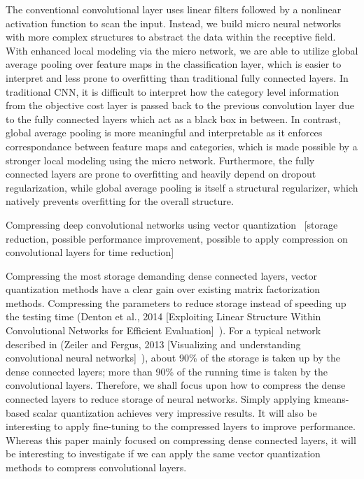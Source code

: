 \documentclass{article} %
\begin{document}
The conventional convolutional layer uses linear filters followed by a nonlinear activation function to scan the input. Instead, we build micro neural networks with more complex structures to abstract the data within the receptive field. With enhanced local modeling via the micro network, we are able to utilize global average pooling over feature maps in the classification layer, which is easier to interpret and less prone to overfitting than traditional fully connected layers. In traditional CNN, it is difficult to interpret how the category level information from the objective cost layer is passed back to the previous convolution layer due to the fully connected layers which act as a black box in between. In contrast, global average pooling is more meaningful and interpretable as it enforces correspondance between feature maps and categories, which is made possible by a stronger local modeling using the micro network. Furthermore, the fully connected layers are prone to overfitting and heavily depend on dropout regularization, while global average pooling is itself a structural regularizer, which natively prevents overfitting for the overall structure.

Compressing deep convolutional networks using vector quantization~\cite{DBLP:journals/corr/GongLYB14} [storage reduction, possible performance improvement, possible to apply compression on convolutional layers for time reduction]

Compressing the most storage demanding dense connected layers, vector quantization methods have a clear gain over existing matrix factorization methods. Compressing the parameters to reduce storage instead of speeding up the testing time (Denton et al., 2014 [Exploiting Linear Structure Within Convolutional Networks for Efficient Evaluation]~\cite{denton2014exploiting}). For a typical network described in (Zeiler and Fergus, 2013 [Visualizing and understanding convolutional neural networks]~\cite{zeiler2014visualizing}), about 90\% of the storage is taken up by the dense connected layers; more than 90\% of the running time is taken by the convolutional layers. Therefore, we shall focus upon how to compress the dense connected layers to reduce storage of neural networks. Simply applying kmeans-based scalar quantization achieves very impressive results. It will also be interesting to apply fine-tuning to the compressed layers to improve performance. Whereas this paper mainly focused on compressing dense connected layers, it will be interesting to investigate if we can apply the same vector quantization methods to compress convolutional layers.
\end{document}
